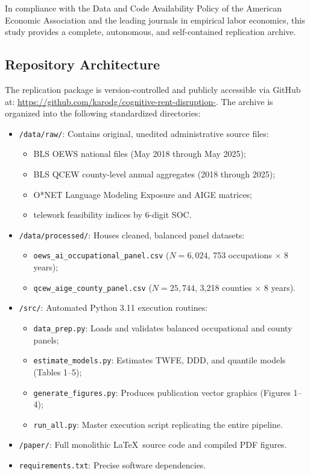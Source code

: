 \documentclass[12pt]{article}
\begin{document}
In compliance with the Data and Code Availability Policy of the American Economic Association and the leading journals in empirical labor economics, this study provides a complete, autonomous, and self-contained replication archive.

\subsection{Repository Architecture}

The replication package is version-controlled and publicly accessible via GitHub at:
\url{https://github.com/karodg/cognitive-rent-disruption-}. The archive is organized into the following standardized directories:
\begin{itemize}
    \item \texttt{/data/raw/}: Contains original, unedited administrative source files:
    \begin{itemize}
        \item BLS OEWS national files (May 2018 through May 2025);
        \item BLS QCEW county-level annual aggregates (2018 through 2025);
        \item \citet{felten2021, felten2023} O*NET Language Modeling Exposure and AIGE matrices;
        \item \citet{dingelNeiman2020} telework feasibility indices by 6-digit SOC.
    \end{itemize}
    \item \texttt{/data/processed/}: Houses cleaned, balanced panel datasets:
    \begin{itemize}
        \item \texttt{oews\_ai\_occupational\_panel.csv} ($N = 6,024$, 753 occupations $\times$ 8 years);
        \item \texttt{qcew\_aige\_county\_panel.csv} ($N = 25,744$, 3,218 counties $\times$ 8 years).
    \end{itemize}
    \item \texttt{/src/}: Automated Python 3.11 execution routines:
    \begin{itemize}
        \item \texttt{data\_prep.py}: Loads and validates balanced occupational and county panels;
        \item \texttt{estimate\_models.py}: Estimates TWFE, DDD, and quantile models (Tables 1--5);
        \item \texttt{generate\_figures.py}: Produces publication vector graphics (Figures 1--4);
        \item \texttt{run\_all.py}: Master execution script replicating the entire pipeline.
    \end{itemize}
    \item \texttt{/paper/}: Full monolithic \LaTeX\ source code and compiled PDF figures.
    \item \texttt{requirements.txt}: Precise software dependencies.
\end{itemize}
\end{document}
